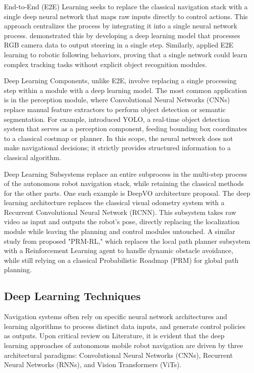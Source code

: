 End-to-End (E2E) Learning seeks to replace the classical navigation stack with a single deep neural network that maps raw inputs directly to control actions. This approach centralizes the process by integrating it into a single neural network process. \cite{Kim2018EndToEndNavigation}  demonstrated this by developing a deep learning model that processes RGB camera data to output steering in a single step. Similarly, \cite{Pierre2018EndToEndFollowing} applied E2E learning to robotic following behaviors, proving that a single network could learn complex tracking tasks without explicit object recognition modules.

Deep Learning Components, unlike E2E, involve replacing a single processing step within a module with a deep learning model. The most common application is in the perception module, where Convolutional Neural Networks (CNNs) replace manual feature extractors to perform object detection or semantic segmentation. For example, \cite{Redmon2016YOLO} introduced YOLO, a real-time object detection system that serves as a perception component, feeding bounding box coordinates to a classical costmap or planner. In this scope, the neural network does not make navigational decisions; it strictly provides structured information to a classical algorithm.

Deep Learning Subsystems replace an entire subprocess in the multi-step process of the autonomous robot navigation stack, while retaining the classical methods for the other parts. One such example is \cite{Mohanty2016DeepVO} DeepVO architecture proposal. The deep learning architecture replaces the classical visual odometry system with a Recurrent Convolutional Neural Network (RCNN). This subsystem takes raw video as input and outputs the robot's pose, directly replacing the localization module while leaving the planning and control modules untouched. A similar study from \cite{Faust_Ramirez_Fiser_Oslund_Francis_Davidson_Tapia_2017} proposed "PRM-RL," which replaces the local path planner subsystem with a Reinforcement Learning agent to handle dynamic obstacle avoidance, while still relying on a classical Probabilistic Roadmap (PRM) for global path planning. 

\subsection{Deep Learning Techniques}
Navigation systems often rely on specific neural network architectures and learning algorithms to process distinct data inputs, and generate control policies as outputs. Upon critical review on Literature, it is evident that the deep learning approaches of autonomous mobile robot navigation are driven by three architectural paradigms: Convolutional Neural Networks (CNNs), Recurrent Neural Networks (RNNs), and Vision Transformers (ViTs).

